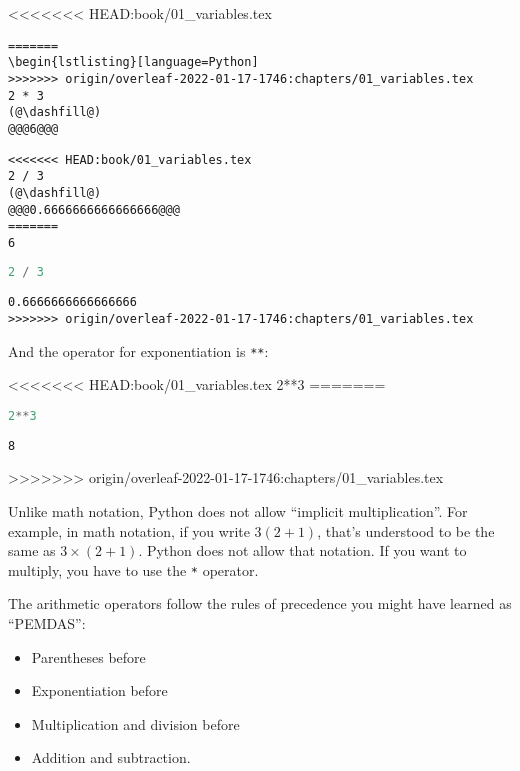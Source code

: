 <<<<<<< HEAD:book/01_variables.tex
\begin{lstlisting}[]
=======
\begin{lstlisting}[language=Python]
>>>>>>> origin/overleaf-2022-01-17-1746:chapters/01_variables.tex
2 * 3
(@\dashfill@)
@@@6@@@
\end{lstlisting}

\begin{lstlisting}[]
<<<<<<< HEAD:book/01_variables.tex
2 / 3
(@\dashfill@)
@@@0.6666666666666666@@@
=======
6
\end{lstlisting}

\begin{lstlisting}[language=Python]
2 / 3
\end{lstlisting}

\begin{lstlisting}[]
0.6666666666666666
>>>>>>> origin/overleaf-2022-01-17-1746:chapters/01_variables.tex
\end{lstlisting}

And the operator for exponentiation is \passthrough{\lstinline!**!}:

<<<<<<< HEAD:book/01_variables.tex
2**3
=======
\begin{lstlisting}[language=Python]
2**3
\end{lstlisting}

\begin{lstlisting}[]
8
\end{lstlisting}
>>>>>>> origin/overleaf-2022-01-17-1746:chapters/01_variables.tex

Unlike math notation, Python does not allow ``implicit multiplication''.
For example, in math notation, if you write \(3 (2 + 1)\), that's
understood to be the same as \(3 \times (2+ 1)\). Python does not allow
that notation. If you want to multiply, you have to use the
\passthrough{\lstinline!*!} operator.

The arithmetic operators follow the rules of precedence you might have
learned as ``PEMDAS'':

\begin{itemize}
<<<<<<< HEAD:book/01_variables.tex

=======
>>>>>>> origin/overleaf-2022-01-17-1746:chapters/01_variables.tex
\item
  Parentheses before
\item
  Exponentiation before
\item
  Multiplication and division before
\item
  Addition and subtraction.
\end{itemize}

